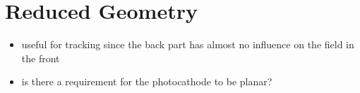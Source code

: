 \section{Reduced Geometry}
\begin{itemize}
  \item useful for tracking since the back part has almost no influence on the field in the front
  \item is there a requirement for the photocathode to be planar?
\end{itemize}

\begin{center}
\begin{figure}
  
\end{figure}
\end{center}

\begin{center}
\begin{figure}
  
\end{figure}
\end{center}

\begin{center}
\begin{figure}
  
\end{figure}
\end{center}

\begin{figure}
  \hspace{-2.5cm}
  
\end{figure}
